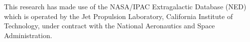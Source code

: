 \documentclass[twocolumn,tighten]{aastex62}
\begin{document}
\acknowledgements

This research has made use of the NASA/IPAC Extragalactic Database (NED) which is operated by the Jet Propulsion Laboratory, California Institute of Technology, under contract with the National Aeronautics and Space Administration. 



%

\end{document}
